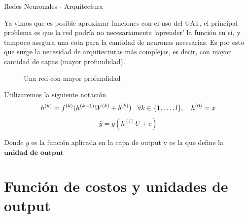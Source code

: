 \documentclass[9pt]{beamer}
\begin{document}
\begin{frame}{Redes Neuronales - Arquitectura}

Ya vimos que es posible aproximar funciones con el uso del UAT, el principal problema es que la red podría no necesariamente 'aprender' la función en si, y tampoco asegura una cota para la cantidad de neuronas necesarias. Es por esto que surge la necesidad de arquitecturas más complejas, es decir, con mayor cantidad de capas (mayor profundidad). \pause

\begin{figure}[H]
  \centering
  \caption{Una red con mayor profundidad}
\end{figure}

\pause 

Utilizaremos la siguiente notación 
\begin{equation}
h^{(k)} = f^{(k)}(h^{(k-1)}W^{(k)} + b^{(k)}) \hspace{0.3cm} \forall k \in \{1 ,\dots, l\}, \quad h^{(0)}=x
\end{equation}
\begin{equation}
\hat{y} = g(h^{(l)}U + c)
\end{equation}

Donde $g$ es la función aplicada en la capa de output y es la que define la $\textbf{unidad de output}$

\end{frame}

\section{Función de costos y unidades de output}
\end{document}
